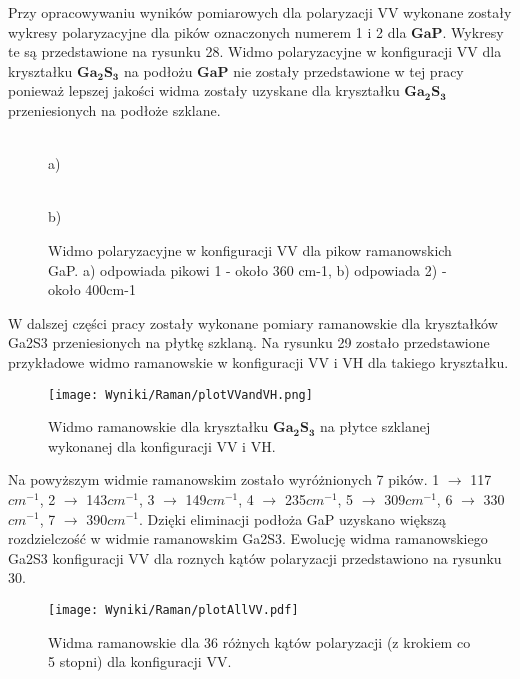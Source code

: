 Przy opracowywaniu wyników pomiarowych dla polaryzacji VV wykonane zostały wykresy polaryzacyjne dla pików oznaczonych numerem 1 i 2 dla $\mathbf{GaP}$. Wykresy te są przedstawione na rysunku 28. Widmo polaryzacyjne w konfiguracji VV dla kryształku $\mathbf{Ga_2S_3}$ na podłożu $\mathbf{GaP}$ nie zostały przedstawione w tej pracy ponieważ lepszej jakości widma zostały uzyskane dla kryształku $\mathbf{Ga_2S_3}$ przeniesionych na podłoże szklane.
\begin{figure}[H]
	\begin{minipage}[h]{0.5\linewidth}
		 \\ a) 
	\end{minipage}
	\hfill
	\begin{minipage}[h]{0.5\linewidth}
		 \\b)
	\end{minipage}
	\caption{Widmo polaryzacyjne w konfiguracji VV dla pikow ramanowskich GaP. a) odpowiada pikowi 1 - około 360 cm-1, b) odpowiada 2) - około 400cm-1}
\end{figure}

W dalszej części pracy zostały wykonane pomiary ramanowskie dla kryształków Ga2S3 przeniesionych na płytkę szklaną. Na rysunku 29 zostało przedstawione przykładowe widmo ramanowskie w konfiguracji VV i VH dla takiego kryształku.

\begin{figure}[H]
	\begin{center}
		\texttt{[image: Wyniki/Raman/plotVVandVH.png]}
		\caption{Widmo ramanowskie dla kryształku $\mathbf{Ga_{2}S_{3}}$ na płytce szklanej wykonanej dla konfiguracji VV i VH.}
	\end{center}
\end{figure}

Na powyższym widmie ramanowskim zostało wyróżnionych 7 pików. 1 $\rightarrow$ 117$cm^{-1}$, 2 $\rightarrow$ 143$cm^{-1}$, 3 $\rightarrow$ 149$cm^{-1}$, 4 $\rightarrow$ 235$cm^{-1}$, 5 $\rightarrow$ 309$cm^{-1}$, 6 $\rightarrow$ 330$cm^{-1}$, 7 $\rightarrow$ 390$cm^{-1}$. Dzięki eliminacji podłoża GaP uzyskano większą rozdzielczość w widmie ramanowskim Ga2S3. Ewolucję widma ramanowskiego Ga2S3 konfiguracji VV dla roznych kątów polaryzacji przedstawiono na rysunku 30.

\begin{figure}[H]
	\begin{center}
		\texttt{[image: Wyniki/Raman/plotAllVV.pdf]}
		\caption{Widma ramanowskie dla 36 różnych kątów polaryzacji (z krokiem co 5 stopni) dla konfiguracji VV.}
	\end{center}
\end{figure}

